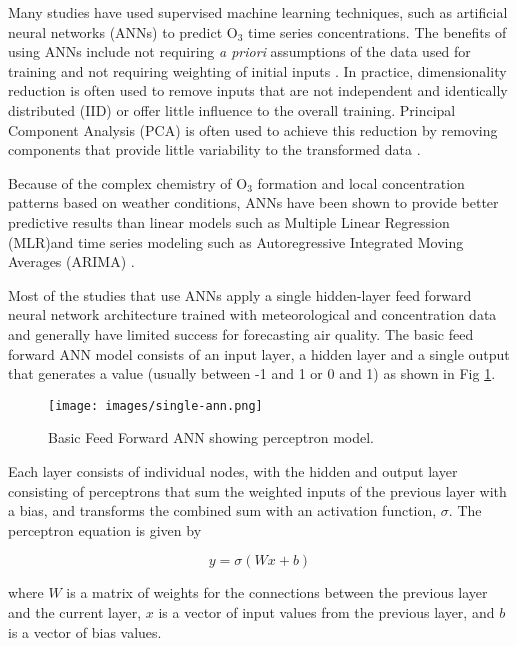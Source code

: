 \documentclass[preprint,12pt,authoryear]{elsarticle}
\begin{document}
\begin{linenumbers}
Many studies have used supervised machine learning techniques, such as artificial neural networks (ANNs) to predict O$_{3}$ \citep{Comrie1997, Dorling2003, Ettouney2009a, Kurt2008, Biancofiore2017} time series concentrations. The benefits of using ANNs include not requiring \textit{a priori} assumptions of the data used for training and not requiring weighting of initial inputs \citep{Gardner1998}. In practice, dimensionality reduction is often used to remove inputs that are not independent and identically distributed (IID) or offer little influence to the overall training. Principal Component Analysis (PCA) is often used to achieve this reduction by removing components that provide little variability to the transformed data \citep{Singh2013, Wang2015a}.

Because of the complex chemistry of O$_{3}$ formation and local concentration patterns based on weather conditions, ANNs have been shown to provide better predictive results than linear models such as Multiple Linear Regression (MLR)and time series modeling such as Autoregressive Integrated Moving Averages (ARIMA) \citep{Gardner1998, Prybutok2000}. 

Most of the studies that use ANNs apply a single hidden-layer feed forward neural network architecture trained with meteorological and concentration data and generally have limited success for forecasting air quality. The basic feed forward ANN model consists of an input layer, a hidden layer and a single output that generates a value (usually between -1 and 1 or 0 and 1) as shown in Fig \ref{fig:SingleANN}. \\
%
\begin{figure}[H]
\centering
\texttt{[image: images/single-ann.png]} 
\caption{Basic Feed Forward ANN showing perceptron model.}
\label{fig:SingleANN}
\end{figure}
%
Each layer consists of individual nodes, with the hidden and output layer consisting of perceptrons that sum the weighted inputs of the previous layer with a bias, and transforms the combined sum with an activation function, $\sigma$. The perceptron equation is given by

\begin{equation}
\label{eq:perceptron}
y= \sigma(Wx+b)
\end{equation}

where $W$ is a matrix of weights for the connections between the previous layer and the current layer, $x$ is a vector of input values from the previous layer, and $b$ is a vector of bias values. 


\end{linenumbers}
\end{document}
